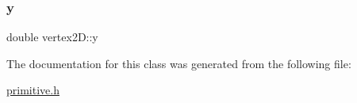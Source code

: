 \mbox{\label{classvertex2_d_aaa0010f8b85b5837db64ef78f8151afe}} 
\subsubsection{\texorpdfstring{y}{y}}
{\footnotesize\ttfamily double vertex2\+D\+::y}



The documentation for this class was generated from the following file\+:\begin{DoxyCompactItemize}
\item 
\mbox{\hyperlink{primitive_8h}{primitive.\+h}}\end{DoxyCompactItemize}
